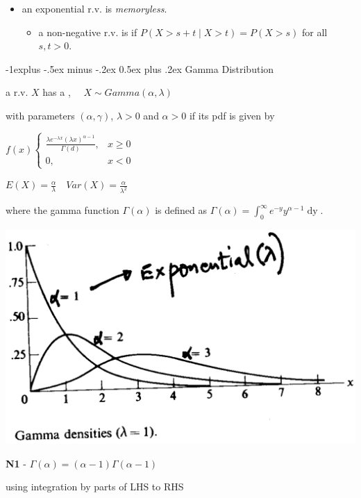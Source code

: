 \documentclass[10pt, landscape]{article}
\makeatletter
\renewcommand{\subsection}{\@startsection{subsection}{2}{0mm}%
  {-1explus -.5ex minus -.2ex}%
  {0.5ex plus .2ex}%
{\normalfont\normalsize\bfseries}}
\makeatother
\begin{document}
\begin{multicols*}{3}
  \begin{itemize}
    \item an exponential r.v. is \textit{memoryless}.
      \begin{itemize}
        \item a non-negative r.v. is  if $P(X > s + t \mid X > t) = P(X > s)$ for all  $s, t > 0$.
      \end{itemize}
  \end{itemize}

  \subsection{Gamma Distribution}

  a r.v. $X$ has a , $\quad X \sim Gamma(\alpha, \lambda)$ 

  with parameters $(\alpha, \gamma)$, $\lambda > 0$ and $\alpha > 0$ if its pdf is given by 

  \begin{tightcenter}
    $f(x) \begin{cases} \frac{\lambda e^{-\lambda x}(\lambda x)^{\alpha - 1}}{\Gamma(d)} , &x \geq 0 \\ 0, &x < 0 \end{cases} $

    $E(X) = \frac{\alpha}{\lambda} \quad Var(X) = \frac{\alpha}{\lambda^2}$
  \end{tightcenter}

  where the gamma function $\Gamma(\alpha)$ is defined as 
  $\Gamma (\alpha) = \int^\infty_0 e^{-y} y^{\alpha - 1} \mathop{dy} $.

  \begin{minipage}[c]{0.4\linewidth}
    \begin{tightcenter}
      \includegraphics[width=0.9\linewidth]{st2131-gamma-distribution.png} 
    \end{tightcenter}
  \end{minipage}
  \begin{minipage}[c]{0.55\linewidth}
    \textbf{N1} - $\Gamma(\alpha) = (\alpha - 1) \Gamma(\alpha-1) $
    \begin{niceproof}
      using integration by parts of LHS to RHS
    \end{niceproof}


\end{minipage}
\end{multicols*}
\end{document}
